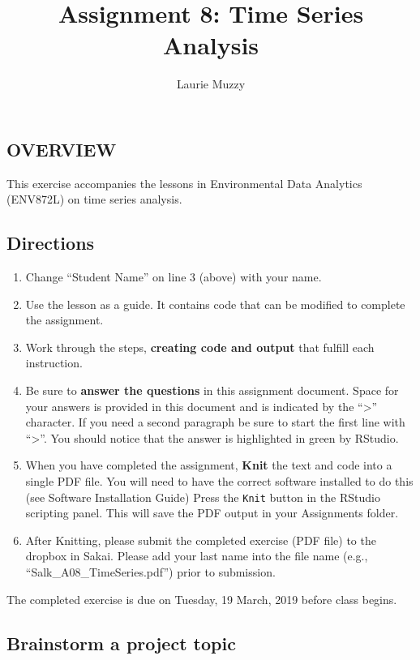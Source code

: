 \documentclass[]{article}
\title{Assignment 8: Time Series Analysis}
\author{Laurie Muzzy}
\date{}
\providecommand{\tightlist}{%
  \setlength{\itemsep}{0pt}\setlength{\parskip}{0pt}}
\begin{document}
\maketitle

\subsection{OVERVIEW}\label{overview}

This exercise accompanies the lessons in Environmental Data Analytics
(ENV872L) on time series analysis.

\subsection{Directions}\label{directions}

\begin{enumerate}
\def\labelenumi{\arabic{enumi}.}
\tightlist
\item
  Change ``Student Name'' on line 3 (above) with your name.
\item
  Use the lesson as a guide. It contains code that can be modified to
  complete the assignment.
\item
  Work through the steps, \textbf{creating code and output} that fulfill
  each instruction.
\item
  Be sure to \textbf{answer the questions} in this assignment document.
  Space for your answers is provided in this document and is indicated
  by the ``\textgreater{}'' character. If you need a second paragraph be
  sure to start the first line with ``\textgreater{}''. You should
  notice that the answer is highlighted in green by RStudio.
\item
  When you have completed the assignment, \textbf{Knit} the text and
  code into a single PDF file. You will need to have the correct
  software installed to do this (see Software Installation Guide) Press
  the \texttt{Knit} button in the RStudio scripting panel. This will
  save the PDF output in your Assignments folder.
\item
  After Knitting, please submit the completed exercise (PDF file) to the
  dropbox in Sakai. Please add your last name into the file name (e.g.,
  ``Salk\_A08\_TimeSeries.pdf'') prior to submission.
\end{enumerate}

The completed exercise is due on Tuesday, 19 March, 2019 before class
begins.

\subsection{Brainstorm a project
topic}\label{brainstorm-a-project-topic}
\end{document}
